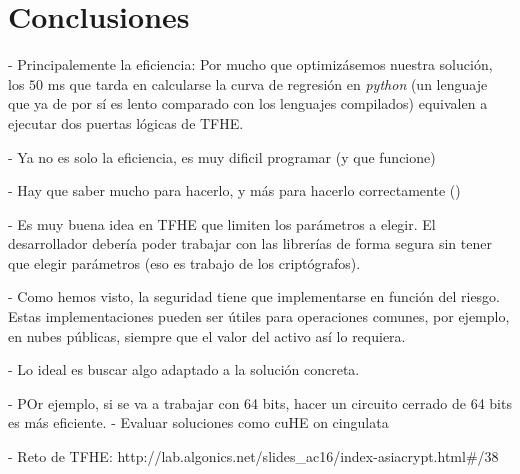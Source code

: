 \chapter{Conclusiones}
\label{chap:conclusiones}

- Principalemente la eficiencia: Por mucho que optimizásemos nuestra solución, los $50$ ms que tarda en calcularse la curva de regresión en \textit{python} (un lenguaje que ya de por sí es lento comparado con los lenguajes compilados) equivalen a ejecutar dos puertas lógicas de TFHE.


- Ya no es solo la eficiencia, es muy dificil programar (y que funcione)

- Hay que saber mucho para hacerlo, y más para hacerlo correctamente (\cite{peng_danger_2019})

- Es muy buena idea en TFHE que limiten los parámetros a elegir. El desarrollador debería poder trabajar con las librerías de forma segura sin tener que elegir parámetros (eso es trabajo de los criptógrafos).

- Como hemos visto, la seguridad tiene que implementarse en función del riesgo. Estas implementaciones pueden ser útiles para operaciones comunes, por ejemplo, en nubes públicas, siempre que el valor del activo así lo requiera.


- Lo ideal es buscar algo adaptado a la solución concreta.

    - POr ejemplo, si se va a trabajar con 64 bits, hacer un circuito cerrado de 64 bits es más eficiente.
- Evaluar soluciones como cuHE on cingulata


- Reto de TFHE: http://lab.algonics.net/slides_ac16/index-asiacrypt.html#/38
